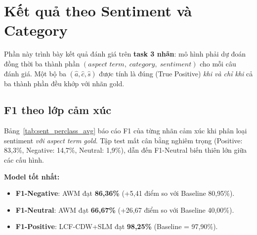\section{Kết quả theo Sentiment và Category}
\label{sec:e2e_3label}

Phần này trình bày kết quả đánh giá trên \textbf{task 3 nhãn}:
mô hình phải dự đoán đồng thời ba thành phần
$(\textit{aspect term},\; \textit{category},\; \textit{sentiment})$
cho mỗi câu đánh giá. Một bộ ba $(\hat{a}, \hat{c}, \hat{s})$ được tính
là đúng (True Positive) \emph{khi và chỉ khi} cả ba thành phần đều khớp
với nhãn gold.

\subsection{F1 theo lớp cảm xúc}
\label{subsec:sent_perclass_avg}

Bảng~\ref{tab:sent_perclass_avg} báo cáo F1 của từng nhãn cảm xúc
khi phân loại sentiment \emph{với aspect term gold}. Tập test mất cân
bằng nghiêm trọng (Positive: 83,3\%, Negative: 14,7\%, Neutral: 1,9\%),
dẫn đến F1-Neutral biến thiên lớn giữa các cấu hình.

\textbf{Model tốt nhất:}
\begin{itemize}
  \item \textbf{F1-Negative}: AWM đạt \textbf{86,36\%}
        (+5,41 điểm so với Baseline 80,95\%).
  \item \textbf{F1-Neutral}: AWM đạt \textbf{66,67\%}
        (+26,67 điểm so với Baseline 40,00\%).
  \item \textbf{F1-Positive}: LCF-CDW+SLM đạt \textbf{98,25\%}
        (Baseline = 97,90\%).
\end{itemize}

